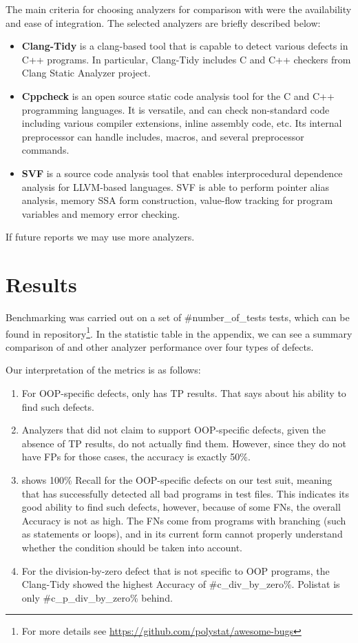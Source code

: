 The main criteria for choosing analyzers for comparison with \polystat{} were the availability and ease of integration. The selected analyzers are briefly described below:

\begin{itemize}
    \item \textbf{Clang-Tidy} is a clang-based tool that is capable to detect various defects in C++ programs. In particular, Clang-Tidy includes C and C++ checkers from Clang Static Analyzer project.
    \item \textbf{Cppcheck} is an open source static code analysis tool for the C and C++ programming languages. It is versatile, and can check non-standard code including various compiler extensions, inline  assembly code, etc. Its internal preprocessor can handle includes, macros, and several preprocessor commands.
    \item \textbf{SVF} is a source code analysis tool that enables interprocedural dependence analysis for LLVM-based languages. SVF is able to perform pointer alias analysis, memory SSA form construction, value-flow tracking for program variables and memory error checking.
\end{itemize}

If future reports we may use more analyzers.

\section{Results}
Benchmarking was carried out on a set of #number_of_tests tests, which can be found in repository\footnote{For more details see \url{https://github.com/polystat/awesome-bugs}}. In the statistic table in the appendix, we can see a summary comparison of \polystat{} and other analyzer performance over four types of defects.

Our interpretation of the metrics is as follows:
\begin{enumerate}
    \item For OOP-specific defects, only \polystat{} has TP results. That says about his ability to find such defects.
    \item Analyzers that did not claim to support OOP-specific defects, given the absence of TP results, do not actually find them. However, since they do not have FPs for those cases, the accuracy is exactly 50\%.
    \item \polystat{} shows 100\% Recall for the OOP-specific defects on our test suit, meaning that \polystat{} has successfully detected all bad programs in test files. This indicates its good ability to find such defects, however, because of some FNs, the overall Accuracy is not as high. The FNs come from programs with branching (such as  statements or  loops), and in its current form \polystat{} cannot properly understand whether the condition should be taken into account.
    \item For the division-by-zero defect that is not specific to OOP programs, the Clang-Tidy showed the highest Accuracy of #c_div_by_zero\%. Polistat is only #c_p_div_by_zero\% behind.
\end{enumerate}

